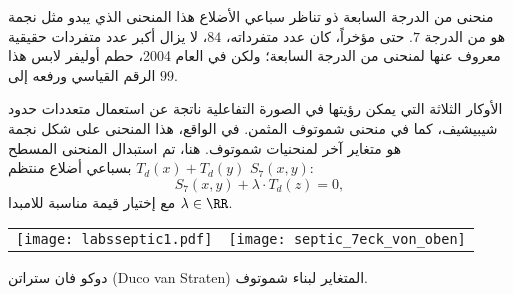 \begin{surferPage}{منحنى من الدرجة السابعة ذو تناظر سباعي الأضلاع}
هذا المنحنى الذي يبدو مثل نجمة هو من الدرجة $7$. 
   حتى مؤخراً، كان عدد متفرداته، $84$، لا يزال أكبر عدد متفردات حقيقية معروف عنها لمنحنى من الدرجة السابعة؛ 
   ولكن في العام 2004، حطم أوليفر لابس هذا الرقم القياسي ورفعه إلى $99$.  
  
    الأوكار الثلاثة التي يمكن رؤيتها في الصورة التفاعلية ناتجة عن استعمال متعددات حدود شيبيشيف، كما في منحنى شموتوف المثمن.  
    في الواقع، هذا المنحنى على شكل نجمة هو متغاير آخر لمنحنيات شموتوف.
    هنا، تم استبدال المنحنى المسطح $T_d(x)+T_d(y)$ بسباعي أضلاع منتظم $S_7(x,y)$: 
   \[S_7(x,y) + \lambda \cdot T_d(z) = 0,\]
   مع إختيار قيمة مناسبة للامبدا  $\lambda\in\RR$. 
    \vspace*{-0.3em}
    \begin{center}
      \begin{tabular}{c@{\qquad}c}
        \texttt{[image: labsseptic1.pdf]}
        &
        \texttt{[image: septic\_7eck\_von\_oben]}
      \end{tabular}
    \end{center}
    \vspace*{-0.3em}   
    دوكو فان ستراتن
     \textenglish{(Duco van Straten)}
     المتغاير لبناء شموتوف.
\end{surferPage}
